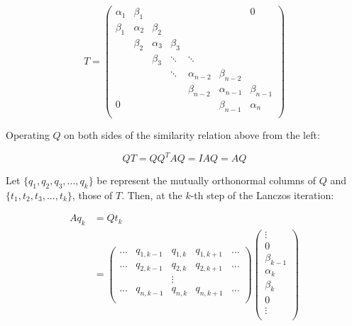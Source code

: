 \[
T = \begin{pmatrix}
    \alpha_1 & \beta_1    &                &               &                         &                      & 0              \\
    \beta_1  & \alpha_2  & \beta_2   &               &                         &                      &                  \\
                 & \beta_2    & \alpha_3  & \beta_3  &                        &                      &                   \\
                 &                &  \beta_3    &\ddots    & \ddots             &                      &                    \\
                 &                 &           &     \ddots     &  \alpha_{n-2}   &  \beta_{n-2} &                     \\
                 &                 &           &                     & \beta_{n-2}     & \alpha_{n-1} & \beta_{n-1}  \\
             0  &                 &           &                     &                         & \beta_{n-1}   & \alpha_n      \\
 
  \end{pmatrix}
\]

Operating $Q$ on both sides of the similarity relation above from the left: 

\[ QT = QQ^{T}AQ = IAQ= AQ \]

Let $\lbrace q_1, q_2, q_3, ... , q_k \rbrace $ be represent the mutually orthonormal columns of $Q$ and $\lbrace t_1,t_2,t_3,...,t_k \rbrace$, those of $T$.  Then, at the $k$-th step of the Lanczos iteration:

\begin{align}
A q_k &= Q t_k \\
&= \begin{pmatrix} 
\dots & q_{1,k-1} & q_{1,k} & q_{1,k+1} & \dots \\
\dots & q_{2,k-1} & q_{2,k} & q_{2,k+1} & \dots \\
& & \vdots & & \\
\dots & q_{n,k-1} & q_{n,k} & q_{n,k+1} & \dots \\
\end{pmatrix} 
\begin{pmatrix}
\vdots \\
0 \\
\beta_{k-1}\\
\alpha_{k}\\
\beta_{k}\\
0 \\
\vdots \\
\end{pmatrix}
\end{align}

